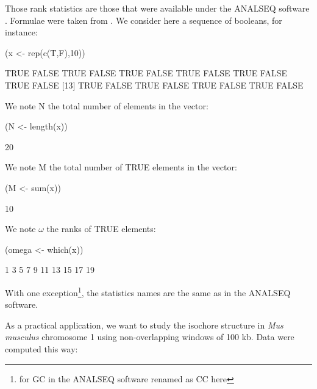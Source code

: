 \documentclass{article}
\begin{document}
Those rank statistics are those that were available under the ANALSEQ
software \cite{analseq, acnuc1984}. Formulae were taken from \cite{ChasseJL1988}.
We consider here a sequence
of booleans, for instance:

\begin{Schunk}
\begin{Sinput}
 (x <- rep(c(T,F),10))
\end{Sinput}
\begin{Soutput}
 [1]  TRUE FALSE  TRUE FALSE  TRUE FALSE  TRUE FALSE  TRUE FALSE  TRUE FALSE
[13]  TRUE FALSE  TRUE FALSE  TRUE FALSE  TRUE FALSE
\end{Soutput}
\end{Schunk}

We note $\mathrm{N}$ the total number of elements in the vector:

\begin{Schunk}
\begin{Sinput}
 (N <- length(x))
\end{Sinput}
\begin{Soutput}
[1] 20
\end{Soutput}
\end{Schunk}

We note $\mathrm{M}$ the total number of TRUE elements in the vector:

\begin{Schunk}
\begin{Sinput}
 (M <- sum(x))
\end{Sinput}
\begin{Soutput}
[1] 10
\end{Soutput}
\end{Schunk}

We note $\omega$ the ranks of TRUE elements:

\begin{Schunk}
\begin{Sinput}
 (omega <- which(x))
\end{Sinput}
\begin{Soutput}
 [1]  1  3  5  7  9 11 13 15 17 19
\end{Soutput}
\end{Schunk}

With one exception\footnote{for GC in the ANALSEQ software renamed as CC here}, 
the statistics names are the same as in the ANALSEQ software.

As a practical application, we want to study the isochore structure in \textit{Mus
musculus} chromosome 1 using non-overlapping windows of 100 kb. Data were 
computed this way:
\end{document}
